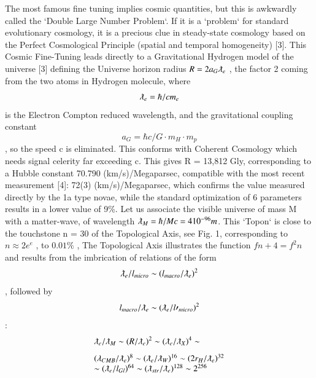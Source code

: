 \documentclass[twoside,draft]{article}
\begin{document}
{The most famous fine tuning implies cosmic quantities, but this is awkwardly called the `Double
Large Number Problem`. If it is a `problem` for standard evolutionary cosmology, it is a precious
clue in steady-state cosmology based on the Perfect Cosmological Principle (spatial and temporal
homogeneity) [3].
This Cosmic Fine-Tuning leads directly to a Gravitational Hydrogen model of the universe [3]
defining the Universe horizon radius $R = 2a_{G} \lambdabar_{e}$ , the factor 2 coming from the two atoms in
Hydrogen molecule, where 
\begin{equation}
\lambdabar_{e} = \hbar/cm_{e}
\end{equation} is the Electron Compton reduced wavelength, and the
gravitational coupling constant 
\begin{equation}
a_{G} = \hbar c/G \cdot m_{H} \cdot m_{p}
\end{equation}, so the speed c is eliminated. This conforms with
Coherent Cosmology which needs signal celerity far exceeding c. This gives R = 13,812 Gly, corresponding to a Hubble constant 70.790 (km/s)/Megaparsec, compatible with the
most recent measurement [4]: 72(3) (km/s)/Megaparsec, which confirms the value measured
directly by the 1a type novae, while the standard optimization of 6 parameters results in a lower
value of 9\%.
Let us associate the visible universe of mass M with a matter-wave, of wavelength $\lambdabar_{M} = \hbar /Mc = 4
10^{-96} m$. This `Topon` is close to the touchstone n = 30 of the Topological Axis, see Fig. 1,
corresponding to $n \approx 2e^{e}$ , to $0.01\%$ , The Topological Axis illustrates the function $f{n + 4} = f^{2}{n}$
and results from the imbrication of relations of the form 
\begin{equation}
\lambdabar_{e} /l_{micro} \sim (l_{macro} /\lambdabar_{e})^{2}
\end{equation}
, followed by 
\begin{equation}
l_{macro} /\lambdabar_{e} \sim (\lambdabar_{e} /l\prime_{micro} )^{2}
\end{equation}:
$$
\begin{array}{ll}
%
\displaystyle
\lambdabar_{e}/\lambdabar_{M} \sim (R/\lambdabar_{e})^{2} \sim (\lambdabar_{e}/ \lambdabar_{X})^{4} \sim \\[+8pt]  %
(\lambda_{CMB}/ \lambdabar_{e})^{8} \sim (\lambdabar_{e}/\lambdabar_{W})^{16} \sim (2r_{H} /\lambdabar_{e})^{32}\\%
\sim (\lambdabar_{e}/ l_{Gl} )^{64} \sim (\lambdabar_{str} /\lambdabar_{e} )^{128} \sim 2^{256}\\%

\end{array}$$}
\end{document}
